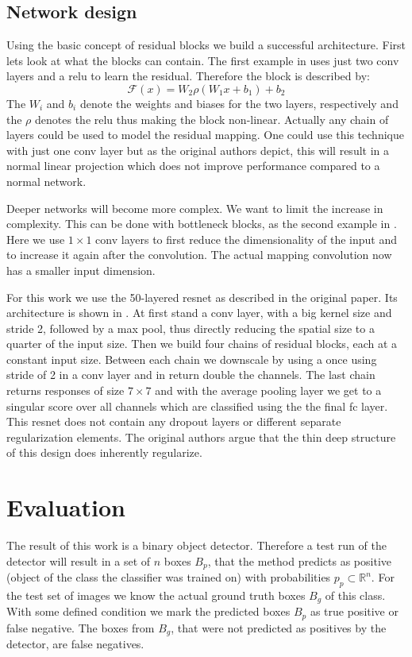 \subsection{Network design}
\label{sec:concepts:resnet:design}
Using the basic concept of residual blocks we build a successful architecture. First lets look at what the blocks can contain. The first example in  uses just two \gls{conv} layers and a \gls{relu} to learn the residual. Therefore the block is described by:
\begin{equation}
    \mathcal{F}(x) = W_2\rho(W_1 x + b_1) + b_2
\end{equation}
The $W_i$ and $b_i$ denote the weights and biases for the two layers, respectively and the $\rho$ denotes the \gls{relu} thus making the block non-linear. Actually any chain of layers could be used to model the residual mapping. One could use this technique with just one \gls{conv} layer but as the original authors \citep{he_deep_2016} depict, this will result in a normal linear projection which does not improve performance compared to a normal network.

Deeper networks will become more complex. We want to limit the increase in complexity. This can be done with bottleneck blocks, as the second example in . Here we use $1\times1$ \gls{conv} layers to first reduce the dimensionality of the input and to increase it again after the convolution. The actual mapping convolution now has a smaller input dimension.

For this work we use the 50-layered \gls{resnet} as described in the original paper. Its architecture is shown in . At first stand a \gls{conv} layer, with a big kernel size and stride 2, followed by a max pool,  thus directly reducing the spatial size to a quarter of the input size. Then we build four chains of residual blocks, each at a constant input size. Between each chain we downscale by using a once using stride of 2 in a \gls{conv} layer and in return double the channels. The last chain returns responses  of size $7 \times 7$ and with the average pooling layer we get to a singular score over all channels which are classified using the the final \gls{fc} layer.\\
This \gls{resnet} does not contain any dropout layers or different separate regularization elements. The original authors argue that the thin deep structure of this design does inherently regularize.

\clearpage
\section{Evaluation}
\label{sec:concepts:eval}
The result of this work is a binary object detector. Therefore a test run of the detector will result in a set of $n$ boxes $B_p$, that the method predicts as positive (object of the class the classifier was trained on) with probabilities $p_p \subset \mathbb{R}^n$. For the test set of images we know the actual ground truth boxes $B_g$ of this class. With some defined condition we mark the predicted boxes $B_p$ as true positive or false negative. The boxes from $B_g$, that were not predicted as positives by the detector, are false negatives.

